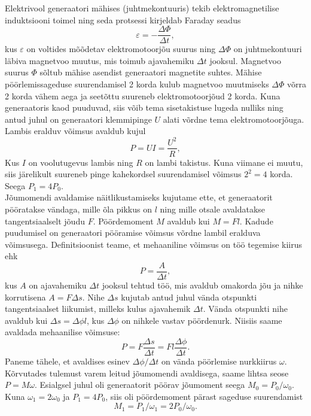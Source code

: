{\ifSolution
\osa Elektrivool generaatori mähises (juhtmekontuuris) tekib elektromagnetilise induktsiooni toimel ning seda protsessi kirjeldab Faraday seadus
$$
\varepsilon = -\frac{\Delta\Phi}{\Delta t},
$$
kus $\varepsilon$ on voltides mõõdetav elektromotoorjõu suurus ning $\Delta\Phi$ on juhtmekontuuri läbiva magnetvoo muutus, mis toimub ajavahemiku $\Delta t$ jooksul. Magnetvoo suurus $\Phi$ sõltub mähise asendist generaatori magnetite suhtes. Mähise pöörlemissageduse suurendamisel 2 korda kulub magnetvoo muutmiseks $\Delta\Phi$ võrra 2 korda vähem aega ja seetõttu suureneb elektromotoorjõud 2 korda. Kuna generaatoris kaod puuduvad, siis võib tema sisetakistuse lugeda nulliks ning antud juhul on generaatori klemmipinge $U$ alati võrdne tema elektromotoorjõuga. Lambis eralduv võimsus avaldub kujul
$$
P = UI = \frac{U^2}{R},
$$
Kus $I$ on voolutugevus lambis ning $R$ on lambi takistus. Kuna viimane ei muutu, siis järelikult suureneb pinge kahekordsel suurendamisel võimsus $2^2=4$ korda. Seega $P_1=4P_0$.\\
\osa Jõumomendi avaldamise näitlikustamiseks kujutame ette, et generaatorit pööratakse vändaga, mille õla pikkus on $l$ ning mille otsale avaldatakse tangentsiaalselt jõudu $F$. Pöördemoment $M$ avaldub kui $M=Fl$. Kadude puudumisel on generaatori pööramise võimsus võrdne lambil eralduva võimsusega. Definitsioonist teame, et mehaaniline võimsus on töö tegemise kiirus ehk
$$
P = \frac{A}{\Delta t},
$$
kus $A$ on ajavahemiku $\Delta t$ jooksul tehtud töö, mis avaldub omakorda jõu ja nihke korrutisena $A=F \Delta s$. Nihe $\Delta s$ kujutab antud juhul vända otspunkti tangentsiaalset liikumist, milleks kulus ajavahemik $\Delta t$. Vända otspunkti nihe avaldub kui $\Delta s=\Delta\phi l$, kus $\Delta\phi$ on nihkele vastav pöördenurk. Niisiis saame avaldada mehaanilise võimsuse:
$$
P = F \frac{\Delta s}{\Delta t} =Fl \frac{\Delta\phi}{\Delta t}.
$$
Paneme tähele, et avaldises esinev $\Delta\phi / \Delta t$ on vända pöörlemise nurkkiirus $\omega$. Kõrvutades tulemust varem leitud jõumomendi avaldisega, saame lihtsa seose $P=M\omega$. Esialgsel juhul oli generaatorit pöörav jõumoment seega
$M_0 = P_0/\omega_0$. Kuna $\omega_1=2\omega_0$ ja $P_1=4P_0$, siis oli pöördemoment pärast sageduse suurendamist
\[
M_1 = P_1/\omega_1=2P_0/\omega_0.
\]
\fi


}
